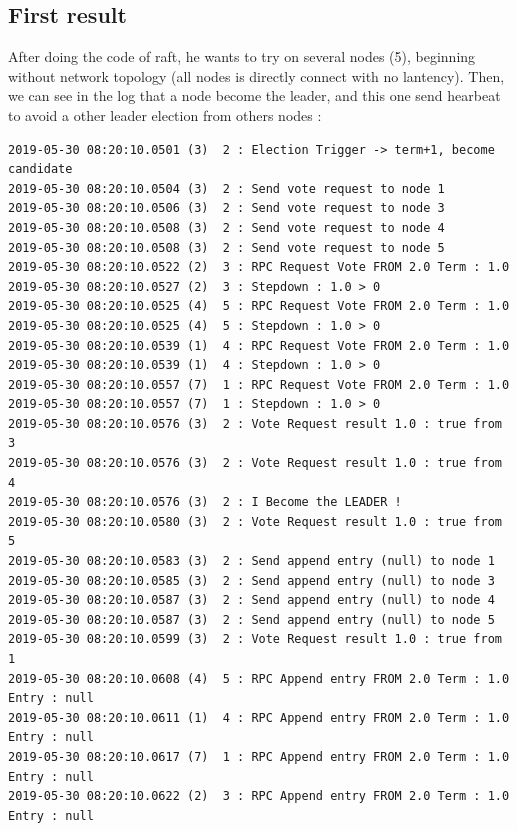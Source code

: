 \documentclass{eplmastersthesis}
\begin{document}
        

        \subsection{First result} %
        After doing the code of raft, he wants to try on several nodes (5), beginning without network topology
        (all nodes is directly connect with no lantency). Then, we can see in the log that a node become the leader,
        and this one send hearbeat to avoid a other leader election from others nodes :
          \begin{lstlisting}[style=MyBash]
2019-05-30 08:20:10.0501 (3)  2 : Election Trigger -> term+1, become candidate
2019-05-30 08:20:10.0504 (3)  2 : Send vote request to node 1
2019-05-30 08:20:10.0506 (3)  2 : Send vote request to node 3
2019-05-30 08:20:10.0508 (3)  2 : Send vote request to node 4
2019-05-30 08:20:10.0508 (3)  2 : Send vote request to node 5
2019-05-30 08:20:10.0522 (2)  3 : RPC Request Vote FROM 2.0 Term : 1.0
2019-05-30 08:20:10.0527 (2)  3 : Stepdown : 1.0 > 0
2019-05-30 08:20:10.0525 (4)  5 : RPC Request Vote FROM 2.0 Term : 1.0
2019-05-30 08:20:10.0525 (4)  5 : Stepdown : 1.0 > 0
2019-05-30 08:20:10.0539 (1)  4 : RPC Request Vote FROM 2.0 Term : 1.0
2019-05-30 08:20:10.0539 (1)  4 : Stepdown : 1.0 > 0
2019-05-30 08:20:10.0557 (7)  1 : RPC Request Vote FROM 2.0 Term : 1.0
2019-05-30 08:20:10.0557 (7)  1 : Stepdown : 1.0 > 0
2019-05-30 08:20:10.0576 (3)  2 : Vote Request result 1.0 : true from 3
2019-05-30 08:20:10.0576 (3)  2 : Vote Request result 1.0 : true from 4
2019-05-30 08:20:10.0576 (3)  2 : I Become the LEADER !
2019-05-30 08:20:10.0580 (3)  2 : Vote Request result 1.0 : true from 5
2019-05-30 08:20:10.0583 (3)  2 : Send append entry (null) to node 1
2019-05-30 08:20:10.0585 (3)  2 : Send append entry (null) to node 3
2019-05-30 08:20:10.0587 (3)  2 : Send append entry (null) to node 4
2019-05-30 08:20:10.0587 (3)  2 : Send append entry (null) to node 5
2019-05-30 08:20:10.0599 (3)  2 : Vote Request result 1.0 : true from 1
2019-05-30 08:20:10.0608 (4)  5 : RPC Append entry FROM 2.0 Term : 1.0 Entry : null
2019-05-30 08:20:10.0611 (1)  4 : RPC Append entry FROM 2.0 Term : 1.0 Entry : null
2019-05-30 08:20:10.0617 (7)  1 : RPC Append entry FROM 2.0 Term : 1.0 Entry : null
2019-05-30 08:20:10.0622 (2)  3 : RPC Append entry FROM 2.0 Term : 1.0 Entry : null
          \end{lstlisting}
\end{document}
